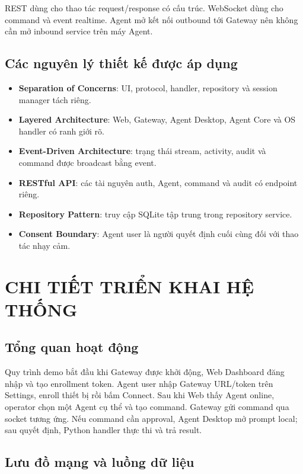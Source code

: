 \documentclass[12pt,a4paper]{article}
\begin{document}
REST dùng cho thao tác request/response có cấu trúc. WebSocket dùng cho command và event realtime. Agent mở kết nối outbound tới Gateway nên không cần mở inbound service trên máy Agent.

\subsection{Các nguyên lý thiết kế được áp dụng}

\begin{itemize}[leftmargin=*]
    \item \textbf{Separation of Concerns}: UI, protocol, handler, repository và session manager tách riêng.
    \item \textbf{Layered Architecture}: Web, Gateway, Agent Desktop, Agent Core và OS handler có ranh giới rõ.
    \item \textbf{Event-Driven Architecture}: trạng thái stream, activity, audit và command được broadcast bằng event.
    \item \textbf{RESTful API}: các tài nguyên auth, Agent, command và audit có endpoint riêng.
    \item \textbf{Repository Pattern}: truy cập SQLite tập trung trong repository service.
    \item \textbf{Consent Boundary}: Agent user là người quyết định cuối cùng đối với thao tác nhạy cảm.
\end{itemize}

\section{CHI TIẾT TRIỂN KHAI HỆ THỐNG}

\subsection{Tổng quan hoạt động}

Quy trình demo bắt đầu khi Gateway được khởi động, Web Dashboard đăng nhập và tạo enrollment token. Agent user nhập Gateway URL/token trên Settings, enroll thiết bị rồi bấm Connect. Sau khi Web thấy Agent online, operator chọn một Agent cụ thể và tạo command. Gateway gửi command qua socket tương ứng. Nếu command cần approval, Agent Desktop mở prompt local; sau quyết định, Python handler thực thi và trả result.

\subsection{Lưu đồ mạng và luồng dữ liệu}
\end{document}
